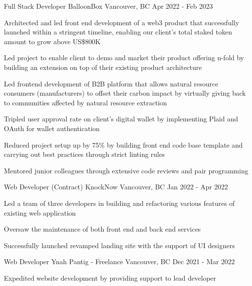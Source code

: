 
\begin{cventries}
  \cventry
    {Full Stack Developer} %
    {BalloonBox} %
    {Vancouver, BC} %
    {Apr 2022 - Feb 2023} %
    {
      \begin{cvitems} %
        \item{Architected and led front end development of a web3 product that successfully launched within a stringent timeline, enabling our client's total staked token amount to grow above US\$800K}
        \item{Led project to enable client to demo and market their product offering n-fold by building an extension on top of their existing product architecture}
        \item{Led frontend development of B2B platform that allows natural resource consumers (manufacturers) to offset their carbon impact by virtually giving back to communities affected by natural resource extraction}
        \item{Tripled user approval rate on client’s digital wallet by implementing Plaid and OAuth for wallet authentication}
        \item{Reduced project setup up by 75\% by building front end code base template and carrying out best practices through strict linting rules}
        \item{Mentored junior colleagues through extensive code reviews and pair programming}
      \end{cvitems}
    }

  \cventry
    {Web Developer (Contract)} %
    {KnockNow} %
    {Vancouver, BC} %
    {Jan 2022 - Apr 2022} %
    {
      \begin{cvitems} %
        \item{Led a team of three developers in building and refactoring various features of existing web application}
        \item{Oversaw the maintenance of both front end and back end services}
        \item{Successfully launched revamped landing site with the support of UI designers}
      \end{cvitems}
    }

  \cventry
    {Web Developer} %
    {Ynah Pantig - Freelance} %
    {Vancouver, BC} %
    {Dec 2021 - Mar 2022} %
    {
      \begin{cvitems} %
        \item {Expedited website development by providing support to lead developer}
      \end{cvitems}
    }


\end{cventries}

